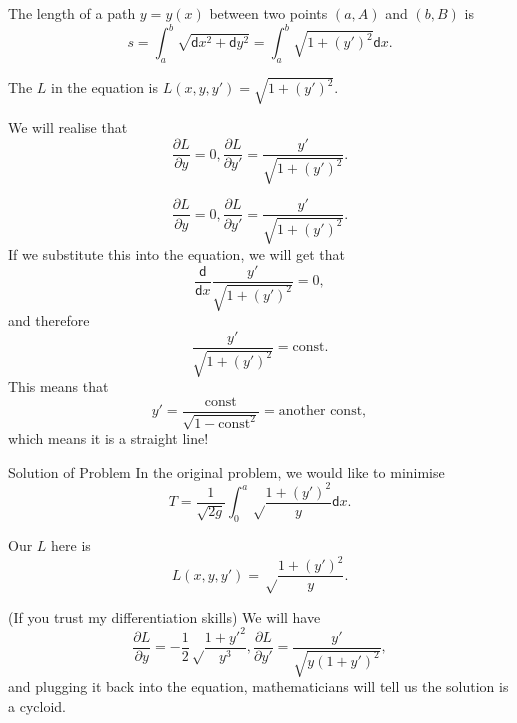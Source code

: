 \documentclass{beamer}
\newcommand{\diff}{\mathsf{d}}
\begin{document}
\begin{frame}
    \begin{example}
        The length of a path \(y = y(x)\) between two points \((a, A)\) and \((b, B)\) is
        \[
            s = \int_{a}^{b} \sqrt{\diff x^2 + \diff y^2} = \int_{a}^{b} \sqrt{1 + (y')^2} \diff x.
        \] \pause

        The \(L\) in the equation is \(L(x, y, y') = \sqrt{1 + (y')^2}\). \pause

        We will realise that
        \[
            \frac{\partial L}{\partial y} = 0, \frac{\partial L}{\partial y'} = \frac{y'}{\sqrt{1 + (y')^2}}.
        \]
    \end{example}
\end{frame}

\begin{frame}
    \begin{example}
        \[
            \frac{\partial L}{\partial y} = 0, \frac{\partial L}{\partial y'} = \frac{y'}{\sqrt{1 + (y')^2}}.
        \]
        If we substitute this into the equation, we will get that \pause
        \[
            \frac{\diff}{\diff x} \frac{y'}{\sqrt{1 + (y')^2}} = 0,
        \] \pause
        and therefore
        \[
            \frac{y'}{\sqrt{1 + (y')^2}} = \text{const}.
        \] \pause
        This means that
        \[
            y' = \frac{\text{const}}{\sqrt{1 - \text{const}^2}} = \text{another const},
        \] \pause
        which means it is a straight line!
    \end{example}
\end{frame}

\begin{frame}{Solution of Problem}
    In the original problem, we would like to minimise
    \[
        T = \frac{1}{\sqrt{2g}} \int_{0}^{a} \sqrt \frac{1 +(y')^2}{y} \diff x.
    \] \pause

    Our \(L\) here is
    \[
        L(x, y, y') = \sqrt \frac{1 + (y')^2}{y}.
    \] \pause

    (If you trust my differentiation skills) We will have
    \[
        \frac{\partial L}{\partial y} = -\frac{1}{2} \sqrt\frac{1 + y'^2}{y^3}, \frac{\partial L}{\partial y'} = \frac{y'}{\sqrt{y (1 + y')^2}},
    \] \pause
    and plugging it back into the equation, mathematicians will tell us the solution is a cycloid.
\end{frame}
\end{document}
